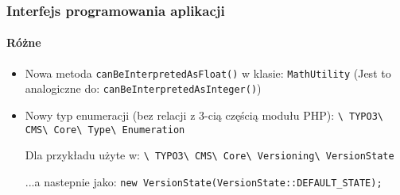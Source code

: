 \begin{frame}[fragile]
	\frametitle{Interfejs programowania aplikacji}
	\framesubtitle{Różne}

	\begin{itemize}
		\item Nowa metoda \texttt{canBeInterpretedAsFloat()} w klasie: \texttt{MathUtility}\newline
			\small(Jest to analogiczne do: \texttt{canBeInterpretedAsInteger()})\normalsize
		\item Nowy typ enumeracji (bez relacji z 3-cią częścią modułu PHP):\newline
			\texttt{\textbackslash
				TYPO3\textbackslash
				CMS\textbackslash
				Core\textbackslash
				Type\textbackslash
				Enumeration}\newline

			Dla przykładu użyte w:\newline
			\texttt{\textbackslash
				TYPO3\textbackslash
				CMS\textbackslash
				Core\textbackslash
				Versioning\textbackslash
				VersionState}\newline

			...a nastepnie jako:\newline
			\texttt{new VersionState(VersionState::DEFAULT\_STATE);}

	\end{itemize}

\end{frame}


